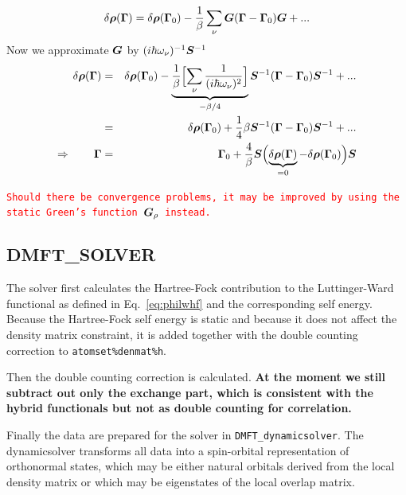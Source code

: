 \documentclass[11pt,a4paper]{report}
\newcommand{\petertt}[1]{\textcolor{red}{\texttt{#1}}}
\begin{document}
\begin{eqnarray}
\delta\bm{\rho}(\bm{\Gamma})=\delta\bm{\rho}(\bm{\Gamma}_0)
-\frac{1}{\beta}\sum_\nu \bm{G}(\bm{\Gamma}-\bm{\Gamma}_0)\bm{G}+...
\end{eqnarray}
Now we approximate $\bm{G}$ by $(i\hbar\omega_\nu)^{-1}\bm{S}^{-1}$
\begin{eqnarray}
\delta\bm{\rho}(\bm{\Gamma})
&=&\delta\bm{\rho}(\bm{\Gamma}_0)
-
\underbrace{\frac{1}{\beta}
\Bigl[\sum_\nu\frac{1}{(i\hbar\omega_\nu)^2} \Bigr]}
_{-\beta/4}
\bm{S}^{-1}(\bm{\Gamma}-\bm{\Gamma}_0)\bm{S}^{-1}+...
\nonumber\\
&=&\delta\bm{\rho}(\bm{\Gamma}_0)
+\frac{1}{4}\beta
\bm{S}^{-1}(\bm{\Gamma}-\bm{\Gamma}_0)\bm{S}^{-1}+...
\nonumber\\
\Rightarrow\qquad\bm{\Gamma}&=&\bm{\Gamma}_0
+\frac{4}{\beta}
\bm{S}
\Bigl(\underbrace{\delta\bm{\rho}(\bm{\Gamma})}_{=0}-\delta\bm{\rho}(\bm{\Gamma}_0)\Bigr)
\bm{S}
\end{eqnarray}


\petertt{Should
  there be convergence problems, it may be improved by using the
  static Green's function $\bm{G}_\rho$ instead.}




\subsection{DMFT\_SOLVER}
The solver first calculates the Hartree-Fock contribution to the
Luttinger-Ward functional as defined in Eq.~\ref{eq:philwhf} and the
corresponding self energy. Because the Hartree-Fock self energy is
static and because it does not affect the density matrix constraint,
it is added together with the double counting correction to
\verb|atomset%denmat%h|.


Then the double counting correction is calculated. \textbf{At the
  moment we still subtract out only the exchange part, which is
  consistent with the hybrid functionals but not as double counting
  for correlation.}

Finally the data are prepared for the solver in
\verb|DMFT_dynamicsolver|. The dynamicsolver transforms all data into
a spin-orbital representation of orthonormal states, which may be
either natural orbitals derived from the local density matrix or which
may be eigenstates of the local overlap matrix.
\end{document}
